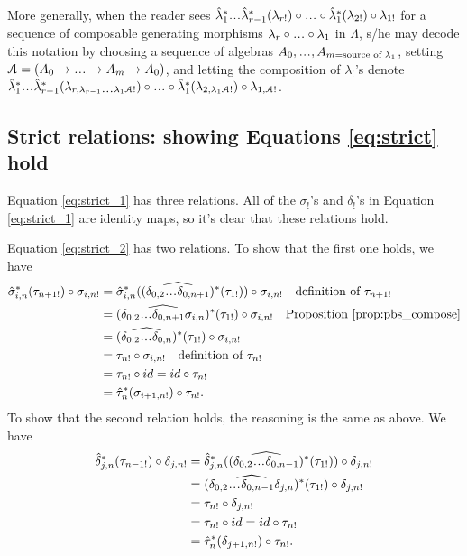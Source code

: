 More generally, when the reader sees 
$\hat{\lambda}_1^* \smdots \hat{\lambda}_{r-1}^*
(\lambda_{r!}) \circ \smdots \circ 
\hat{\lambda}_1^*(\lambda_{2!}) 
\circ \lambda_{1!}$
for a sequence of composable generating morphisms 
$\lambda_r \circ \smdots \circ \lambda_1$ in $\Lambda$, 
s/he may decode this notation by choosing a sequence 
of algebras $A_0, \smdots, A_{m=\textrm{source of }
\lambda_1}$, setting $\mathcal{A} = (A_0 \to \smdots 
\to A_m \to A_0)$, and letting the composition of 
$\lambda_!$'s denote
$\hat{\lambda}_1^* \smdots \hat{\lambda}_{r-1}^*
  (\lambda_{r, \lambda_{r-1} \smdots \lambda_1 \mathcal{A}!}) 
\circ \smdots \circ  
\hat{\lambda}_1^*(\lambda_{2, \lambda_1\mathcal{A}!}) 
\circ \lambda_{1, \mathcal{A}!}$.
%
\subsection{Strict relations: showing Equations \ref{eq:strict} hold}
Equation \ref{eq:strict_1} has three relations. 
All of the $\sigma_!$'s and $\delta_!$'s in Equation 
\ref{eq:strict_1} are identity maps, so it's clear that 
these relations hold.

Equation \ref{eq:strict_2} has two relations. 
To show that the first one holds, we have
\begin{align*}
\hat{\sigma}_{i,n}^*(\tau_{n+1!}) \circ \sigma_{i,n!} 
&= 
\hat{\sigma}_{i,n}^*(
  (\widehat{\delta_{0,2}\smdots\delta_{0,n+1}})^*
  (\tau_{1!})) \circ \sigma_{i,n!}
  \quad \textrm{definition of }\tau_{n+1!}\\
&= 
(\widehat{\delta_{0,2}\smdots\delta_{0,n+1}\sigma_{i,n}})^*
  (\tau_{1!}) \circ \sigma_{i,n!}
  \quad \textrm{Proposition } \ref{prop:pbs_compose}\\
&= 
(\widehat{\delta_{0,2}\smdots\delta_{0,n}})^*
  (\tau_{1!}) \circ \sigma_{i,n!}\\
&= 
\tau_{n!} \circ \sigma_{i,n!}
  \quad \textrm{definition of }\tau_{n!}\\
&= 
\tau_{n!} \circ id  
  = id \circ \tau_{n!} \\
&= 
\hat{\tau}_n^*(\sigma_{i+1,n!}) \circ \tau_{n!}.
\end{align*}
To show that the second relation holds, the 
reasoning is the same as above. We have
\begin{align*}
\hat{\delta}_{j,n}^*(\tau_{n-1!}) \circ \delta_{j,n!} 
&= 
\hat{\delta}_{j,n}^*
  ((\widehat{\delta_{0,2}\smdots\delta_{0,n-1}})^*
  (\tau_{1!})) \circ \delta_{j,n!} \\
&=
(\widehat{\delta_{0,2}\smdots\delta_{0,n-1}\delta_{j,n}})^*
  (\tau_{1!}) \circ \delta_{j,n!} \\
&=
\tau_{n!} \circ \delta_{j,n!}\\
&= 
\tau_{n!} \circ id   
  = id \circ \tau_{n!}\\
&=
\hat{\tau}_n^*(\delta_{j+1,n!}) \circ \tau_{n!}. 
\end{align*} 

